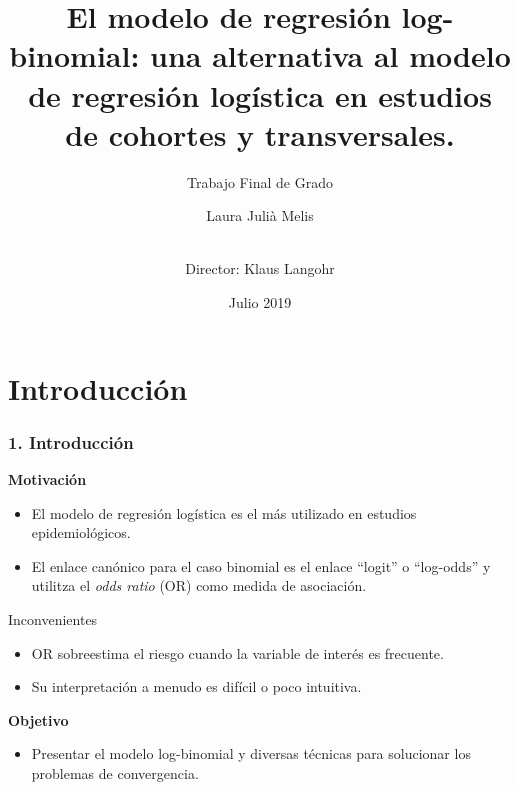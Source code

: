 \documentclass{beamer}
\title[Grado en Estadística UB-UPC]{El modelo de regresión log-binomial: una alternativa al modelo de regresión logística en estudios de cohortes y transversales.}
\subtitle{Trabajo Final de Grado}
\author[Laura Julià Melis]{Laura Julià Melis \and \\ \vspace{0.3cm}
	\footnotesize{Director: Klaus Langohr}}
\date{Julio 2019}
\begin{document}
\begin{frame}
\titlepage
\end{frame}


\section{Introducción}
\begin{frame}
\frametitle{1. Introducción}
\textbf{Motivación}\\
\begin{itemize}
	\item El modelo de {\color{green!55!blue}regresión logística} es el más utilizado en estudios epidemiológicos.
	\item El enlace canónico para el caso binomial es el enlace ``logit'' o ``log-odds'' y utilitza el {\color{green!55!blue} \textit{odds ratio}} (OR) como medida de asociación.
\end{itemize}

\begin{alertblock}{Inconvenientes}
	\begin{itemize}
		\item OR sobreestima el riesgo cuando la variable de interés es frecuente. 
		\item Su interpretación a menudo es difícil o poco intuitiva.
	\end{itemize}	
\end{alertblock}
\vspace{0.2cm}
\textbf{Objetivo}\\
\begin{itemize}
	\item Presentar el modelo {\color{green!55!blue}log-binomial} y diversas técnicas para solucionar los problemas de convergencia.

\end{itemize}
\end{frame}

\end{document}
